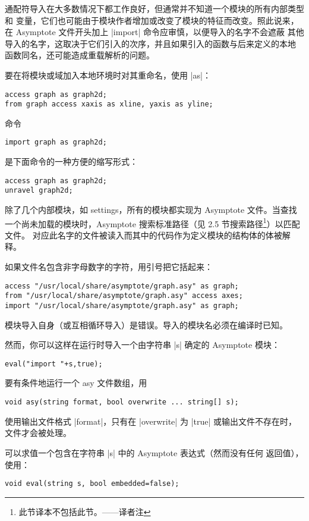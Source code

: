 \documentclass{ctexbook}
\newcommand*\prgname[1]{\textsf{#1}}
\newcommand\transnote[1]{\footnote{#1——译者注}}
\begin{document}
{{{通配符导入在大多数情况下都工作良好，但通常并不知道一个模块的所有内部类型和
变量，它们也可能由于模块作者增加或改变了模块的特征而改变。照此说来，在
\prgname{Asymptote} 文件开头加上 |import| 命令应审慎，以便导入的名字不会遮蔽
其他导入的名字，这取决于它们引入的次序，并且如果引入的函数与后来定义的本地
函数同名，还可能造成重载解析的问题。

要在将模块或域加入本地环境时对其重命名，使用 |as|：
\begin{lstlisting}
access graph as graph2d;
from graph access xaxis as xline, yaxis as yline;
\end{lstlisting}

命令
\begin{lstlisting}
import graph as graph2d;
\end{lstlisting}
是下面命令的一种方便的缩写形式：
\begin{lstlisting}
access graph as graph2d;
unravel graph2d;
\end{lstlisting}

除了几个内部模块，如 \prgname{settings}，所有的模块都实现为
\prgname{Asymptote} 文件。当查找一个尚未加载的模块时，\prgname{Asymptote}
搜索标准路径（见 2.5 节搜索路径\transnote{此节译本不包括此节。}）以匹配文件。
对应此名字的文件被读入而其中的代码作为定义模块的结构体的体被解释。

如果文件名包含非字母数字的字符，用引号把它括起来：
\begin{lstlisting}
access "/usr/local/share/asymptote/graph.asy" as graph;
from "/usr/local/share/asymptote/graph.asy" access axes;
import "/usr/local/share/asymptote/graph.asy" as graph;
\end{lstlisting}

模块导入自身（或互相循环导入）是错误。导入的模块名必须在编译时已知。

然而，你可以这样在运行时导入一个由字符串 |s| 确定的 \prgname{Asymptote}
模块：
\begin{lstlisting}
eval("import "+s,true);
\end{lstlisting}

要有条件地运行一个 asy 文件数组，用
\begin{lstlisting}
void asy(string format, bool overwrite ... string[] s);
\end{lstlisting}

使用输出文件格式 |format|，只有在 |overwrite| 为 |true| 或输出文件不存在时，
文件才会被处理。

可以求值一个包含在字符串 |s| 中的 \prgname{Asymptote} 表达式（然而没有任何
返回值），使用：
\begin{lstlisting}
void eval(string s, bool embedded=false);
\end{lstlisting}

}}}
\end{document}
